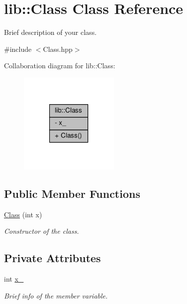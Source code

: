 \hypertarget{classlib_1_1Class}{\section{lib\-:\-:Class Class Reference}
\label{classlib_1_1Class}
}


Brief description of your class.  




{\ttfamily \#include $<$Class.\-hpp$>$}



Collaboration diagram for lib\-:\-:Class\-:\nopagebreak
\begin{figure}[H]
\begin{center}
\leavevmode
\includegraphics[width=136pt]{classlib_1_1Class__coll__graph}
\end{center}
\end{figure}
\subsection*{Public Member Functions}
\begin{DoxyCompactItemize}
\item 
\hyperlink{classlib_1_1Class_a9ac2c333cced24167c6de5d82eb8e121}{Class} (int x)
\begin{DoxyCompactList}\small\item\em Constructor of the class. \end{DoxyCompactList}\end{DoxyCompactItemize}
\subsection*{Private Attributes}
\begin{DoxyCompactItemize}
\item 
int \hyperlink{classlib_1_1Class_a3bc9070f77eddefb3970da53bc2f35cc}{x\-\_\-}
\begin{DoxyCompactList}\small\item\em Brief info of the member variable. \end{DoxyCompactList}\end{DoxyCompactItemize}


